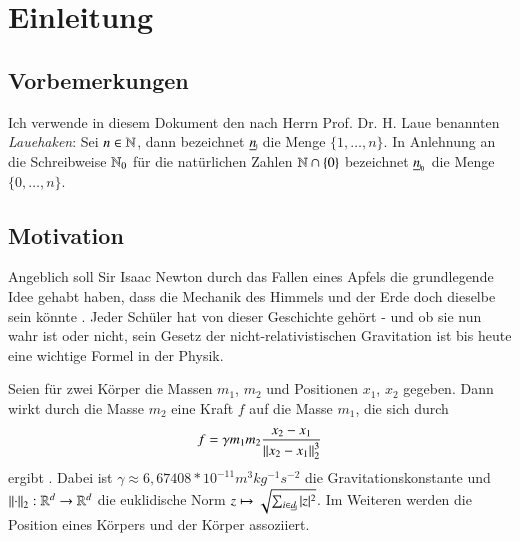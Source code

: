\chapter{Einleitung}
\label{ch:einl}
  \section*{Vorbemerkungen}
    Ich verwende in diesem Dokument den nach Herrn Prof. Dr. H. Laue benannten \textit{Lauehaken}: Sei $n \in \mathbb{N}$, dann bezeichnet $\haken{n}$ die Menge $\{1, \dots ,n\}$.
    In Anlehnung an die Schreibweise $\mathbb{N}_0$ für die natürlichen Zahlen $\mathbb{N} \cap \{0\}$ bezeichnet $\nullhaken{n}$ die Menge $\{0, \dots , n\}$.
  \section{Motivation}
  \label{sec:mot}
    Angeblich soll Sir Isaac Newton durch das Fallen eines Apfels die grundlegende Idee gehabt haben, dass die Mechanik des Himmels und der Erde doch dieselbe sein 
    könnte \citep{memoirs}. Jeder Schüler hat von dieser Geschichte gehört - und ob sie nun wahr ist oder nicht, sein Gesetz der nicht-relativistischen Gravitation ist bis
    heute eine wichtige Formel in der Physik.
    
    Seien für zwei Körper die Massen $m_1$, $m_2$ und Positionen $x_1$, $x_2$ gegeben. Dann wirkt durch die Masse $m_2$ eine Kraft $f$ auf die Masse $m_1$, die sich durch 
    \begin{equation}
      f = \gamma m_1 m_2 \frac{x_2 - x_1}{\left\lVert x_2 - x_1\right\rVert^3_2}
      \label{eq:simple_grav}
    \end{equation}
    ergibt \citep{newton}. Dabei ist $\gamma \approx 6{,}67408*10^{-11} m^3 kg^{-1} s^{-2}$ die Gravitationskonstante \citep{graviconst} und $\left\lVert\cdot\right\rVert_2: \mathbb{R}^d \to \mathbb{R}^d$ die 
    euklidische Norm $z \mapsto \sqrt{ \sum_{i \in \haken{d}} |z|^2 }$. Im Weiteren werden die Position eines Körpers und der Körper assoziiert. 
    
